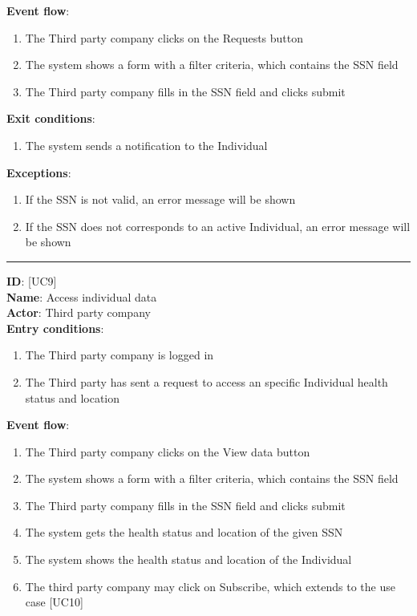 \documentclass[12pt]{report}
\newcommand\usecase[1]{ [UC#1] }
\begin{document}
\begin{itemize}
\begin{enumerate}
  		\end{enumerate}
  	\textbf{Event flow}:
  		\begin{enumerate}
    			\item{The Third party company clicks on the Requests button}
    			\item{The system shows a form with a filter criteria, which contains the SSN field}
    			\item{The Third party company fills in the SSN field and clicks submit}
  		\end{enumerate}
  	\textbf{Exit conditions}:
  		\begin{enumerate}
    			\item{The system sends a notification to the Individual}
  		\end{enumerate}
  	\textbf{Exceptions}: 
  		\begin{enumerate}
    			\item{If the SSN is not valid, an error message will be shown}
    			\item{If the SSN does not corresponds to an active Individual, an error message will be shown}
  		\end{enumerate}
  	\rule{\linewidth}{0.4pt}
  	\textbf{ID}: \usecase{9} \\
  	\textbf{Name}: Access individual data \\
    \textbf{Actor}: Third party company \\
    \textbf{Entry conditions}:
    		\begin{enumerate}
    			\item{The Third party company is logged in}
    			\item{The Third party has sent a request to access an specific Individual health status and location}
  		\end{enumerate}
  	\textbf{Event flow}:
  		\begin{enumerate}
    			\item{The Third party company clicks on the View data button}
    			\item{The system shows a form with a filter criteria, which contains the SSN field}
    			\item{The Third party company fills in the SSN field and clicks submit}
    			\item{The system gets the health status and location of the given SSN}
    			\item{The system shows the health status and location of the Individual}
    			\item{The third party company may click on Subscribe, which extends to the use case \usecase{10}}

\end{enumerate}
\end{itemize}
\end{document}
